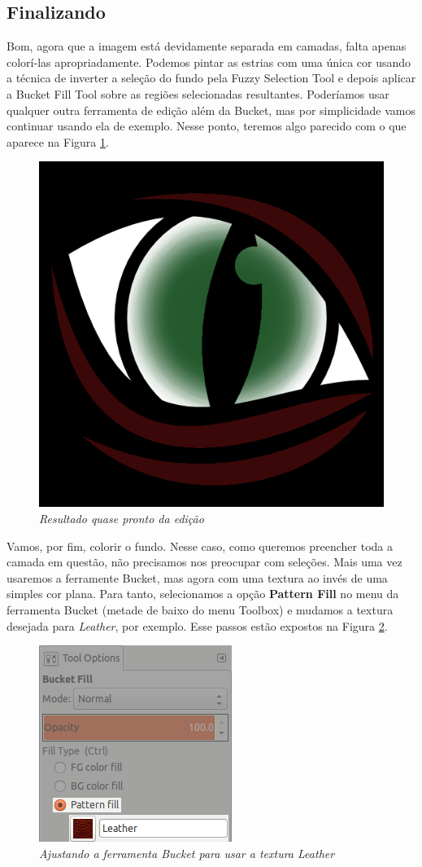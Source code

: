 \documentclass[12pt,onecolumn]{article}
\begin{document}
  \subsection{Finalizando}
  
    Bom, agora que a imagem está devidamente separada em camadas, falta apenas
    colorí-las apropriadamente. Podemos pintar as estrias com uma única cor
    usando a técnica de inverter a seleção do fundo pela Fuzzy Selection Tool e
    depois aplicar a Bucket Fill Tool sobre as regiões selecionadas resultantes.
    Poderíamos usar qualquer outra ferramenta de edição além da Bucket, mas por
    simplicidade vamos continuar usando ela de exemplo. Nesse ponto, teremos
    algo parecido com o que aparece na Figura \ref{fig:partial}.
    
    \begin{figure}[ht]
      \centering
      \includegraphics[width=.3\textwidth]{screenshots/06-partial.png}
      \caption{
        \footnotesize
        \it
        Resultado quase pronto da edição
      }
      \label{fig:partial}
    \end{figure}
    
    Vamos, por fim, colorir o fundo. Nesse caso, como queremos preencher toda a
    camada em questão, não precisamos nos preocupar com seleções. Mais uma vez
    usaremos a ferramente Bucket, mas agora com uma textura ao invés de uma
    simples cor plana. Para tanto, selecionamos a opção {\bf Pattern Fill} no
    menu da ferramenta Bucket (metade de baixo do menu Toolbox) e mudamos a
    textura desejada para {\it Leather}, por exemplo. Esse passos estão expostos
    na Figura \ref{fig:pattern_fill}.
    
    \begin{figure}[ht]
      \centering
      \includegraphics[width=.4\linewidth]{screenshots/07-pattern_fill.png}
      \caption{
        \footnotesize
        \it
        Ajustando a ferramenta Bucket para usar a textura Leather
      }
      \label{fig:pattern_fill}
    \end{figure}
    
\end{document}
